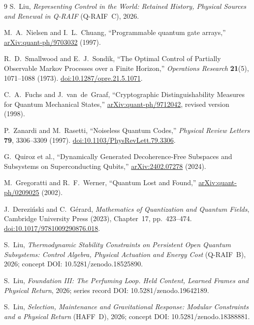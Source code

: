 \documentclass[11pt]{article}
\theoremstyle{definition}
\theoremstyle{remark}
\begin{document}
\begin{thebibliography}{9}
S.~Liu, \emph{Representing Control in the World: Retained History, Physical Sources and Renewal in Q-RAIF} (Q-RAIF~C), 2026.

M.~A.~Nielsen and I.~L.~Chuang,
``Programmable quantum gate arrays,''
\href{https://arxiv.org/abs/quant-ph/9703032}{arXiv:quant-ph/9703032} (1997).

R.~D.~Smallwood and E.~J.~Sondik,
``The Optimal Control of Partially Observable Markov Processes over a Finite Horizon,''
\emph{Operations Research} \textbf{21}(5), 1071--1088 (1973).
\href{https://doi.org/10.1287/opre.21.5.1071}{doi:10.1287/opre.21.5.1071}.

C.~A.~Fuchs and J.~van~de~Graaf,
``Cryptographic Distinguishability Measures for Quantum Mechanical States,''
\href{https://arxiv.org/abs/quant-ph/9712042}{arXiv:quant-ph/9712042}, revised version (1998).

P.~Zanardi and M.~Rasetti,
``Noiseless Quantum Codes,''
\emph{Physical Review Letters} \textbf{79}, 3306--3309 (1997).
\href{https://doi.org/10.1103/PhysRevLett.79.3306}{doi:10.1103/PhysRevLett.79.3306}.

G.~Quiroz et al.,
``Dynamically Generated Decoherence-Free Subspaces and Subsystems on Superconducting Qubits,''
\href{https://arxiv.org/abs/2402.07278}{arXiv:2402.07278} (2024).

M.~Gregoratti and R.~F.~Werner,
``Quantum Lost and Found,''
\href{https://arxiv.org/abs/quant-ph/0209025}{arXiv:quant-ph/0209025} (2002).

J.~Dereziński and C.~Gérard,
\emph{Mathematics of Quantization and Quantum Fields},
Cambridge University Press (2023), Chapter~17, pp.~423--474.
\href{https://doi.org/10.1017/9781009290876.018}{doi:10.1017/9781009290876.018}.

S.~Liu, \emph{Thermodynamic Stability Constraints on Persistent Open Quantum
Subsystems: Control Algebra, Physical Actuation and Energy Cost}
(Q-RAIF~B), 2026; concept DOI: 10.5281/zenodo.18525890.

S.~Liu, \emph{Foundation III: The Perfuming Loop. Held Content, Learned Frames and Physical Return}, 2026; series record DOI: 10.5281/zenodo.19642189.

S.~Liu, \emph{Selection, Maintenance and Gravitational Response: Modular Constraints and a Physical Return}
(HAFF~D), 2026; concept DOI: 10.5281/zenodo.18388881.


\end{thebibliography}
\end{document}
